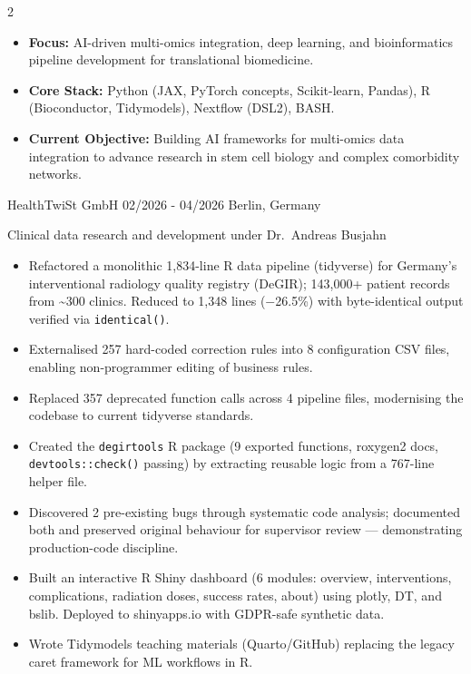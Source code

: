 \documentclass{thejus_cv}
\begin{document}
\begin{paracol}{2}


\begin{itemize}[label=\textbullet, leftmargin=1em]
    \item \textbf{Focus:} AI-driven multi-omics integration, deep learning, and bioinformatics pipeline development for translational biomedicine.
    \item \textbf{Core Stack:} Python (JAX, PyTorch concepts, Scikit-learn, Pandas), R (Bioconductor, Tidymodels), Nextflow (DSL2), BASH.
    \item \textbf{Current Objective:} Building AI frameworks for multi-omics data integration to advance research in stem cell biology and complex comorbidity networks.
\end{itemize}


             {HealthTwiSt GmbH}
             {02/2026 - 04/2026}
             {Berlin, Germany}
             {Clinical data research and development under Dr.~Andreas Busjahn
             \begin{itemize}\setlength{\itemsep}{0.05em}
                   \item Refactored a monolithic 1,834-line R data pipeline (tidyverse) for Germany's interventional radiology quality registry (DeGIR); 143,000+ patient records from \textasciitilde300 clinics. Reduced to 1,348 lines ($-$26.5\%) with byte-identical output verified via \texttt{identical()}.
                   \item Externalised 257 hard-coded correction rules into 8 configuration CSV files, enabling non-programmer editing of business rules.
                   \item Replaced 357 deprecated function calls across 4 pipeline files, modernising the codebase to current tidyverse standards.
                   \item Created the \texttt{degirtools} R package (9 exported functions, roxygen2 docs, \texttt{devtools::check()} passing) by extracting reusable logic from a 767-line helper file.
                   \item Discovered 2 pre-existing bugs through systematic code analysis; documented both and preserved original behaviour for supervisor review --- demonstrating production-code discipline.
                   \item Built an interactive R Shiny dashboard (6 modules: overview, interventions, complications, radiation doses, success rates, about) using plotly, DT, and bslib. Deployed to shinyapps.io with GDPR-safe synthetic data.
                   \item Wrote Tidymodels teaching materials (Quarto/GitHub) replacing the legacy caret framework for ML workflows in R.
               \end{itemize}}


\end{paracol}
\end{document}
